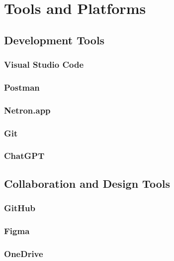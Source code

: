 \section{Tools and Platforms}
\label{sec:tools-and-platforms}

\subsection{Development Tools}
\label{subsec:development-tools}

\subsubsection*{Visual Studio Code}
\label{subsubsec:visual-studio-code}

\subsubsection*{Postman}
\label{subsubsec:postman}

\subsubsection*{Netron.app}
\label{subsubsec:natron}

\subsubsection*{Git}
\label{subsubsec:git}

\subsubsection*{ChatGPT}
\label{subsubsec:chatgpt}

\subsection{Collaboration and Design Tools}
\label{subsec:collaboration-and-design-tools}

\subsubsection*{GitHub}
\label{subsubsec:github}

\subsubsection*{Figma}
\label{subsubsec:figma}

\subsubsection*{OneDrive}
\label{subsubsec:onedrive}

